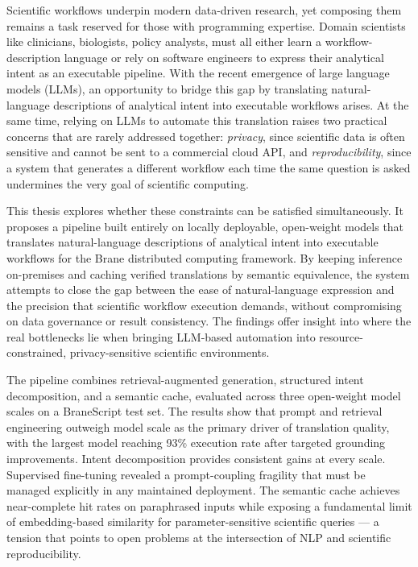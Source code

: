 

\begin{abstracts}        %

Scientific workflows underpin modern data-driven research, yet composing them
remains a task reserved for those with programming expertise. Domain scientists
like clinicians, biologists, policy analysts, must all either learn a
workflow-description language or rely on software engineers to express their
analytical intent as an executable pipeline. With the recent emergence of large 
language models (LLMs), an opportunity to bridge this gap by translating natural-language
descriptions of analytical intent into executable workflows arises.
At the same time, relying on LLMs to automate this translation 
raises two practical concerns that are rarely addressed together: 
\emph{privacy}, since scientific data is often sensitive and cannot be sent to a commercial cloud API, 
and \emph{reproducibility}, since a system that generates a different workflow each
time the same question is asked undermines the very goal of scientific
computing.

This thesis explores whether these constraints can be satisfied simultaneously.
It proposes a pipeline built entirely on locally deployable, open-weight models
that translates natural-language descriptions of analytical intent into
executable workflows for the Brane distributed computing framework. By keeping
inference on-premises and caching verified translations by semantic
equivalence, the system attempts to close the gap between the ease of
natural-language expression and the precision that scientific workflow
execution demands, without compromising on data governance or result
consistency. The findings offer insight into where the real bottlenecks lie
when bringing LLM-based automation into resource-constrained, privacy-sensitive
scientific environments.

The pipeline combines retrieval-augmented generation, structured intent
decomposition, and a semantic cache, evaluated across three open-weight model
scales on a BraneScript test set. The results show that prompt and retrieval
engineering outweigh model scale as the primary driver of translation quality,
with the largest model reaching 93\% execution rate after targeted grounding
improvements. Intent decomposition provides consistent gains at every scale.
Supervised fine-tuning revealed a prompt-coupling fragility that must be
managed explicitly in any maintained deployment. The semantic cache achieves
near-complete hit rates on paraphrased inputs while exposing a fundamental
limit of embedding-based similarity for parameter-sensitive scientific queries
--- a tension that points to open problems at the intersection of NLP and
scientific reproducibility.

\end{abstracts}



